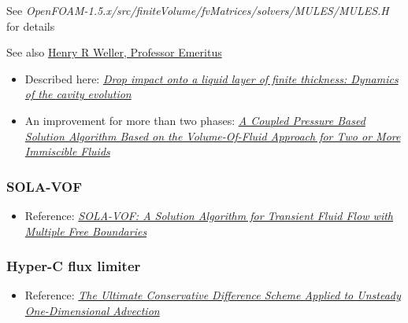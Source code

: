 See \textit{OpenFOAM-1.5.x/src/finiteVolume/fvMatrices/solvers/MULES/MULES.H} for details

See also \href{http://fds.duke.edu/db/aas/Physics/weller}{Henry R Weller, Professor Emeritus}


\begin{itemize}
    \item Described here: \textit{\href{http://link.libris.kb.se/sfxliub?sid=?url_ver=Z39.88-2004&rfr_id=info:sid/bibl.liu.se\%3Axerxes+\%28+PubMed+LiU\%29&rft.genre=article&rft_val_fmt=info\%3Aofi\%2Ffmt\%3Akev\%3Amtx\%3Ajournal&rft.issn=15393755&rft.date=2009&rft.jtitle=Phys+Rev+E+Stat+Nonlin+Soft+Matter+Phys&rft.volume=79&rft.issue=3+Pt+2&rft.spage=036306&rft.atitle=Drop+impact+onto+a+liquid+layer+of+finite+thickness+\%3A+dynamics+of+the+cavity+evolution+&rft.aulast=Berberovi\%C4\%87&rft.aufirst=Edin}{Drop impact onto a liquid layer of finite thickness: Dynamics of the cavity evolution}}
    \item An improvement for more than two phases: \textit{\href{http://www.uni-ulm.de/fileadmin/website_uni_ulm/mawi.inst.070/urban/papers/ECCOMASCFD2010paperfinal.pdf}{A Coupled Pressure Based Solution Algorithm Based on the Volume-Of-Fluid Approach for Two or More Immiscible Fluids}}
\end{itemize}

\subsubsection{SOLA-VOF}

\begin{itemize}
    \item Reference: \textit{\href{http://www.ewp.rpi.edu/hartford/~ernesto/Su2012/CFD/Readings/SOLA-VOF-1980-P1.pdf}{SOLA-VOF: A Solution Algorithm for Transient Fluid Flow with Multiple Free Boundaries}}
\end{itemize}

\subsubsection{Hyper-C flux limiter}

\begin{itemize}
    \item Reference: \textit{\href{http://www.water.tkk.fi/wr/kurssit/Yhd-12.112/TVD1.pdf}{The Ultimate Conservative Difference Scheme Applied to Unsteady One-Dimensional Advection}}
\end{itemize}

